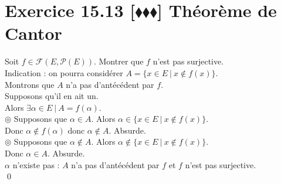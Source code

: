 \documentclass[10pt]{article}
\begin{document}
\section*{Exercice 15.13 [$\blacklozenge\blacklozenge\blacklozenge$] Théorème de Cantor}
\begin{tcolorbox}[enhanced, width=7.6in, center, size=fbox, fontupper=\large, drop shadow southwest]
    Soit $f\in\mathcal{F}(E, \mathcal{P}(E))$. Montrer que $f$ n'est pas surjective.\\
    Indication : on pourra considérer $A = \{x \in E ~ | ~ x \notin f(x)\}$.\\[0.2cm]
    Montrons que $A$ n'a pas d'antécédent par $f$.\\
    Supposons qu'il en ait un.\\
    Alors $\exists \alpha \in E ~ | ~ A = f(\alpha)$.\\
    $\circledcirc$ Supposons que $\alpha \in A$. Alors $\alpha \in \{x \in E ~ | ~ x \notin f(x)\}$.\\
    Donc $\alpha \notin f(\alpha)$ donc $\alpha \notin A$. Absurde.\\[0.15cm]
    $\circledcirc$ Supposons que $\alpha \notin A$. Alors $\alpha \notin \{x \in E ~ | ~ x \notin f(x)\}$.\\
    Donc $\alpha \in A$. Absurde.\\[0.15cm]
    $\alpha$ n'existe pas : $A$ n'a pas d'antécédent par $f$ et $f$ n'est pas surjective.\\
    \qed
\end{tcolorbox}
\end{document}
